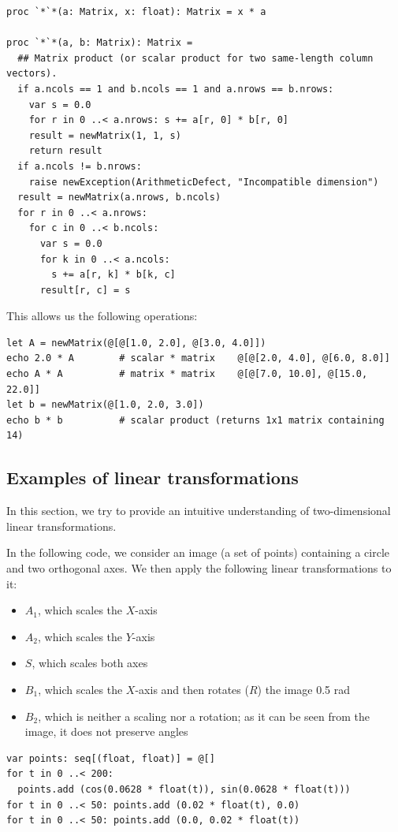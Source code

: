 \documentclass[justified, sixbynine]{tufte-book}
\def\ft{\small\tt}
\theoremstyle{plain}%
\newtheorem * {corollary}{Corollary}
\theoremstyle{definition}
\theoremstyle{remark}
\newtheorem * {remark}{Remark}
\newtheorem * {note}{Note}
\begin{document}
\begin{fullwidth}
\begin{lstlisting}[caption={in file: {\ft nlib/matrix.nim}}]
proc `*`*(a: Matrix, x: float): Matrix = x * a

proc `*`*(a, b: Matrix): Matrix =
  ## Matrix product (or scalar product for two same-length column vectors).
  if a.ncols == 1 and b.ncols == 1 and a.nrows == b.nrows:
    var s = 0.0
    for r in 0 ..< a.nrows: s += a[r, 0] * b[r, 0]
    result = newMatrix(1, 1, s)
    return result
  if a.ncols != b.nrows:
    raise newException(ArithmeticDefect, "Incompatible dimension")
  result = newMatrix(a.nrows, b.ncols)
  for r in 0 ..< a.nrows:
    for c in 0 ..< b.ncols:
      var s = 0.0
      for k in 0 ..< a.ncols:
        s += a[r, k] * b[k, c]
      result[r, c] = s
\end{lstlisting}

This allows us the following operations:
\begin{lstlisting}
let A = newMatrix(@[@[1.0, 2.0], @[3.0, 4.0]])
echo 2.0 * A        # scalar * matrix    @[@[2.0, 4.0], @[6.0, 8.0]]
echo A * A          # matrix * matrix    @[@[7.0, 10.0], @[15.0, 22.0]]
let b = newMatrix(@[1.0, 2.0, 3.0])
echo b * b          # scalar product (returns 1x1 matrix containing 14)
\end{lstlisting}


\goodbreak\subsection{Examples of linear transformations}


In this section, we try to provide an intuitive understanding of two-dimensional linear transformations.

In the following code, we consider an image (a set of points) containing a circle and two orthogonal axes. We then apply the following linear transformations to it:
\begin{itemize}
\item $A_1$, which scales the $X$-axis
\item $A_2$, which scales the $Y$-axis
\item $S$, which scales both axes
\item $B_1$, which scales the $X$-axis and then rotates ($R$) the image 0.5 rad
\item $B_2$, which is neither a scaling nor a rotation; as it can be seen from the image, it does not preserve angles
\end{itemize}

\begin{lstlisting}
var points: seq[(float, float)] = @[]
for t in 0 ..< 200:
  points.add (cos(0.0628 * float(t)), sin(0.0628 * float(t)))
for t in 0 ..< 50: points.add (0.02 * float(t), 0.0)
for t in 0 ..< 50: points.add (0.0, 0.02 * float(t))


\end{lstlisting}
\end{fullwidth}
\end{document}
